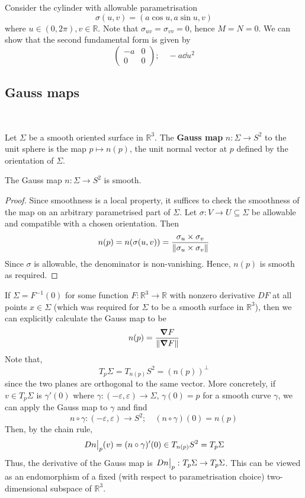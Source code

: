 \documentclass[a4paper]{article}
\begin{document}
\begin{example}
	Consider the cylinder with allowable parametrisation
	\[
		\sigma(u,v) = (a \cos u, a \sin u, v)
	\]
	where \( u \in (0,2\pi), v \in \mathbb R \).
	Note that \( \sigma_{uv} = \sigma_{vv} = 0 \), hence \( M = N = 0 \).
	We can show that the second fundamental form is given by
	\[
		\begin{pmatrix}
			-a & 0 \\
			0  & 0
		\end{pmatrix};\quad -a \dd{u}^2
	\]
\end{example}

\subsection{Gauss maps}
\ \vspace*{-1.5em}
\begin{definition}
	Let \( \Sigma \) be a smooth oriented surface in \( \mathbb R^3 \).
	The \textbf{Gauss map} \( n \colon \Sigma \to S^2 \) to the unit sphere is the map \( p \mapsto n(p) \), the unit normal vector at $p$ defined by the orientation of $\Sigma$. 
\end{definition}
\begin{lemma}
	The Gauss map $ n: \Sigma\to S^2 $ is smooth.
\end{lemma}
\begin{proof}
	Since smoothness is a local property, it suffices to check the smoothness of the map on an arbitrary parametrised part of \( \Sigma \).
	Let \( \sigma \colon V \to U \subseteq \Sigma \) be allowable and compatible with a chosen orientation.
	Then
	\[
		n(p) = n(\sigma(u,v))= \frac{\sigma_u \times \sigma_v}{\norm{\sigma_u \times \sigma_v}}
	\]
	Since \( \sigma \) is allowable, the denominator is non-vanishing.
	Hence, \( n(p) \) is smooth as required.
\end{proof}

If \( \Sigma = F^{-1}(0) \) for some function \( F \colon \mathbb R^3 \to \mathbb R \) with nonzero derivative \( DF \) at all points \( x \in \Sigma \) (which was required for \( \Sigma \) to be a smooth surface in \( \mathbb R^3 \)), then we can explicitly calculate the Gauss map to be
\[
	n(p) = \frac{\grad F}{\norm{\grad F}}
\]
Note that,
\[
	T_p \Sigma = T_{n(p)} S^2 = (n(p))^\perp
\]
since the two planes are orthogonal to the same vector.
More concretely, if \( v \in T_p \Sigma \) is \( \gamma'(0) \) where \( \gamma \colon (-\varepsilon, \varepsilon) \to \Sigma \), \( \gamma(0) = p \) for a smooth curve \( \gamma \), we can apply the Gauss map to \( \gamma \) and find
\[
	n \circ \gamma \colon (-\varepsilon, \varepsilon) \to S^2;\quad (n \circ \gamma)(0) = n(p)
\]
Then, by the chain rule,
\[
	\teval{Dn}{p}(v) = (n \circ \gamma)'(0) \in T_{n(p)} S^2 = T_p \Sigma
\]
Thus, the derivative of the Gauss map is \( \eval{Dn}_p \colon T_p \Sigma \to T_p \Sigma \).
This can be viewed as an endomorphism of a fixed (with respect to parametrisation choice) two-dimensional subspace of \( \mathbb R^3 \).
\end{document}
